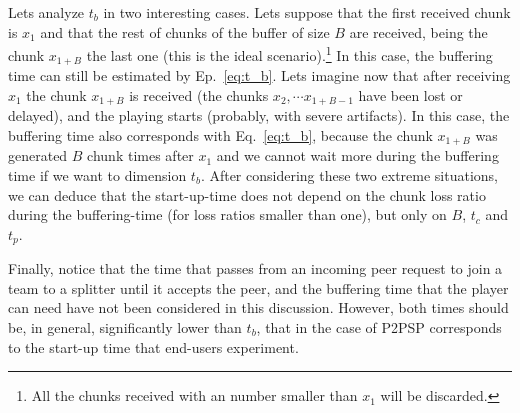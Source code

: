 Lets analyze $t_b$ in two interesting cases. Lets suppose that the
first received chunk is $x_1$ and that the rest of chunks of the
buffer of size $B$ are received, being the chunk $x_{1+B}$ the last
one (this is the ideal scenario).\footnote{All the chunks received
  with an number smaller than $x_1$ will be discarded.} In this case,
the buffering time can still be estimated by Ep.~\ref{eq:t_b}. Lets
imagine now that after receiving $x_1$ the chunk $x_{1+B}$ is received
(the chunks $x_2, \cdots x_{1+B-1}$ have been lost or delayed), and
the playing starts (probably, with severe artifacts). In this case,
the buffering time also corresponds with Eq.~\ref{eq:t_b}, because the
chunk $x_{1+B}$ was generated $B$ chunk times after $x_1$ and we
cannot wait more during the buffering time if we want to dimension
$t_b$. After considering these two extreme situations, we can deduce
that the start-up-time does not depend on the chunk loss ratio during
the buffering-time (for loss ratios smaller than one), but only on
$B$, $t_c$ and $t_p$.

Finally, notice that the time that passes from an incoming peer
request to join a team to a splitter until it accepts the peer, and
the buffering time that the player can need have not been considered
in this discussion. However, both times should be, in general,
significantly lower than $t_b$, that in the case of P2PSP corresponds
to the start-up time that end-users experiment.

